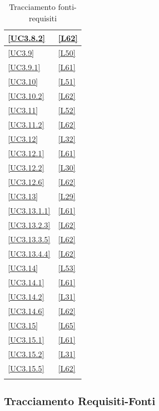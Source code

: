 \begin{longtable}{|P{6cm}|P{6cm}|}
	\hline \ref{UC3.8.2} & \ref{L62} \\
	\hline \ref{UC3.9} & \ref{L50} \\
	\hline \ref{UC3.9.1} & \ref{L61} \\
	\hline \ref{UC3.10} & \ref{L51} \\
	\hline \ref{UC3.10.2} & \ref{L62} \\
	\hline \ref{UC3.11} & \ref{L52} \\
	\hline \ref{UC3.11.2} & \ref{L62} \\
	\hline \ref{UC3.12} & \ref{L32} \\
	\hline \ref{UC3.12.1} & \ref{L61} \\
	\hline \ref{UC3.12.2} & \ref{L30} \\
	\hline \ref{UC3.12.6} & \ref{L62} \\
	\hline \ref{UC3.13} & \ref{L29} \\
	\hline \ref{UC3.13.1.1} & \ref{L61} \\
	\hline \ref{UC3.13.2.3} & \ref{L62} \\
	\hline \ref{UC3.13.3.5} & \ref{L62} \\
	\hline \ref{UC3.13.4.4} & \ref{L62} \\
	\hline \ref{UC3.14} & \ref{L53} \\
	\hline \ref{UC3.14.1} & \ref{L61} \\
	\hline \ref{UC3.14.2} & \ref{L31} \\
	\hline \ref{UC3.14.6} & \ref{L62} \\
	\hline \ref{UC3.15} & \ref{L65} \\
	\hline \ref{UC3.15.1} & \ref{L61} \\
	\hline \ref{UC3.15.2} & \ref{L31} \\
	\hline \ref{UC3.15.5} & \ref{L62} \\
	\hline
	\caption{Tracciamento fonti-requisiti}
\end{longtable}

\subsection{Tracciamento Requisiti-Fonti}

